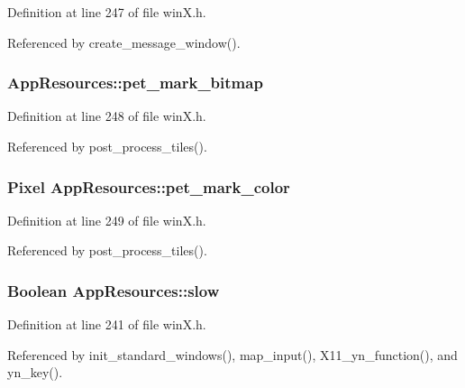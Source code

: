 Definition at line 247 of file win\+X.\+h.



Referenced by create\+\_\+message\+\_\+window().

\hypertarget{structAppResources_a2d293512a3ea1acf1dc55a30ddd1dd9e}{
\subsubsection[{pet\+\_\+mark\+\_\+bitmap}]{ App\+Resources\+::pet\+\_\+mark\+\_\+bitmap}}\label{structAppResources_a2d293512a3ea1acf1dc55a30ddd1dd9e}


Definition at line 248 of file win\+X.\+h.



Referenced by post\+\_\+process\+\_\+tiles().

\hypertarget{structAppResources_a0f401bd76787c747f2fb7b8553d834ce}{
\subsubsection[{pet\+\_\+mark\+\_\+color}]{\setlength{\rightskip}{0pt plus 5cm}Pixel App\+Resources\+::pet\+\_\+mark\+\_\+color}}\label{structAppResources_a0f401bd76787c747f2fb7b8553d834ce}


Definition at line 249 of file win\+X.\+h.



Referenced by post\+\_\+process\+\_\+tiles().

\hypertarget{structAppResources_a1c7a8208dca6dbf4d9907629bc1e8f7f}{
\subsubsection[{slow}]{\setlength{\rightskip}{0pt plus 5cm}Boolean App\+Resources\+::slow}}\label{structAppResources_a1c7a8208dca6dbf4d9907629bc1e8f7f}


Definition at line 241 of file win\+X.\+h.



Referenced by init\+\_\+standard\+\_\+windows(), map\+\_\+input(), X11\+\_\+yn\+\_\+function(), and yn\+\_\+key().

